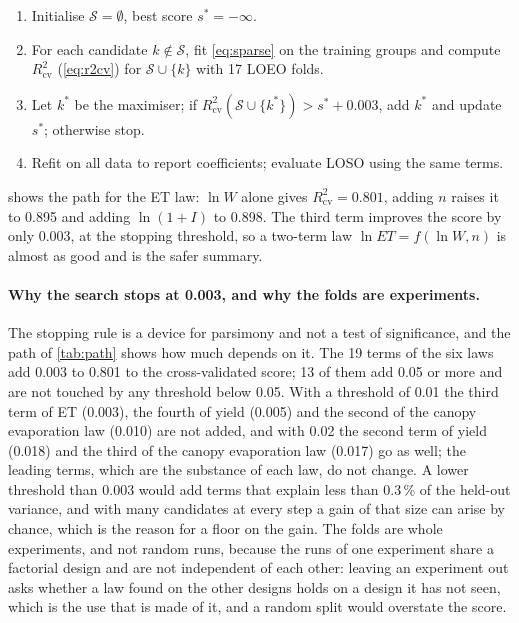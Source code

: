 \documentclass[preprint,12pt,authoryear]{elsarticle}
\begin{document}
\begin{enumerate}[nosep,label=\arabic*.]
\item Initialise $\mathcal S=\emptyset$, best score $s^\ast=-\infty$.
\item For each candidate $k\notin\mathcal S$, fit \cref{eq:sparse} on the training groups and compute $R^2_{\mathrm{cv}}$ (\cref{eq:r2cv}) for $\mathcal S\cup\{k\}$ with 17 LOEO folds.
\item Let $k^\ast$ be the maximiser; if $R^2_{\mathrm{cv}}(\mathcal S\cup\{k^\ast\})>s^\ast+0.003$, add $k^\ast$ and update $s^\ast$; otherwise stop.
\item Refit on all data to report coefficients; evaluate LOSO using the same terms.
\end{enumerate}
 shows the path for the ET law: $\ln W$ alone gives $R^2_{\mathrm{cv}}=0.801$, adding $n$ raises it to 0.895 and adding $\ln(1+I)$ to 0.898. The third term improves the score by only 0.003, at the stopping threshold, so a two-term law $\ln\mathit{ET}=f(\ln W,n)$ is almost as good and is the safer summary.

\paragraph{Why the search stops at 0.003, and why the folds are experiments.} The stopping rule is a device for parsimony and not a test of significance, and the path of \cref{tab:path} shows how much depends on it. The 19 terms of the six laws add 0.003 to 0.801 to the cross-validated score; 13 of them add 0.05 or more and are not touched by any threshold below 0.05. With a threshold of 0.01 the third term of ET (0.003), the fourth of yield (0.005) and the second of the canopy evaporation law (0.010) are not added, and with 0.02 the second term of yield (0.018) and the third of the canopy evaporation law (0.017) go as well; the leading terms, which are the substance of each law, do not change. A lower threshold than 0.003 would add terms that explain less than 0.3\,\% of the held-out variance, and with many candidates at every step a gain of that size can arise by chance, which is the reason for a floor on the gain. The folds are whole experiments, and not random runs, because the runs of one experiment share a factorial design and are not independent of each other: leaving an experiment out asks whether a law found on the other designs holds on a design it has not seen, which is the use that is made of it, and a random split would overstate the score.
\end{document}
